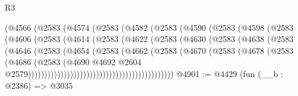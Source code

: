\begin{lexlean}{R3}
\begin{coremodule}
                            (@4566
                              (@2583
                                (@4574
                                  (@2583
                                    (@4582
                                      (@2583
                                        (@4590
                                          (@2583
                                            (@4598
                                              (@2583
                                                (@4606
                                                  (@2583
                                                    (@4614
                                                      (@2583
                                                        (@4622
                                                          (@2583
                                                            (@4630
                                                              (@2583
                                                                (@4638
                                                                  (@2583
                                                                    (@4646
                                                                      (@2583
                                                                        (@4654
                                                                          (@2583
                                                                            (@4662
                                                                              (@2583
                                                                                (@4670
                                                                                  (@2583
                                                                                    (@4678
                                                                                      (@2583
                                                                                        (@4686
                                                                                          (@2583
                                                                                            (@4690
                                                                                              @4692
                                                                                              @2604
                                                                                              @2579)))))))))))))))))))))))))))))))))))))))))))))
@4901 := @4429
    (fun (__b : @2386) =>
    @3035

\end{coremodule}
\end{lexlean}
